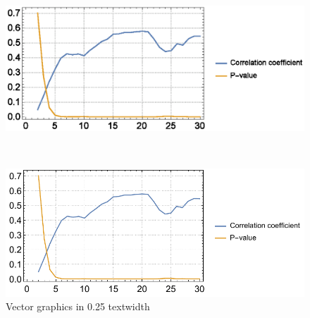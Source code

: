 \documentclass{egpubl}
\begin{document}
\begin{figure}
	\centering
	\begin{minipage}{.25\textwidth}
		\includegraphics[width=1\linewidth]{images/B_spearman.eps}
	\end{minipage}~
	\begin{minipage}{.25\textwidth}
		\includegraphics[width=1\linewidth]{images/B_spearman.pdf}
	\end{minipage}
	\caption{Vector graphics in 0.25 textwidth}
	\label{fig:vector_graphics2}
\end{figure}
\end{document}
